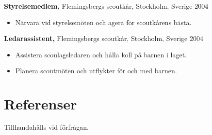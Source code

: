 \documentclass[margin]{res}
\begin{document}
\begin{resume}
{\bf Styrelsemedlem,} Flemingsbergs scoutkår, Stockholm, Sverige \hfill 2004
\begin{itemize} \itemsep -2pt
\item Närvara vid styrelsemöten och agera för scoutkårens bästa.
\end{itemize}
{\bf Ledarassistent,} Flemingsbergs scoutkår, Stockholm, Sverige \hfill 2004
\begin{itemize} \itemsep -2pt
\item Assistera scoulagsledaren och hålla koll på barnen i laget.
\item Planera scoutmöten och utflykter för och med barnen.
\end{itemize}

\section{Referenser}
Tillhandahålls vid förfrågan.

\end{resume}
\end{document}

